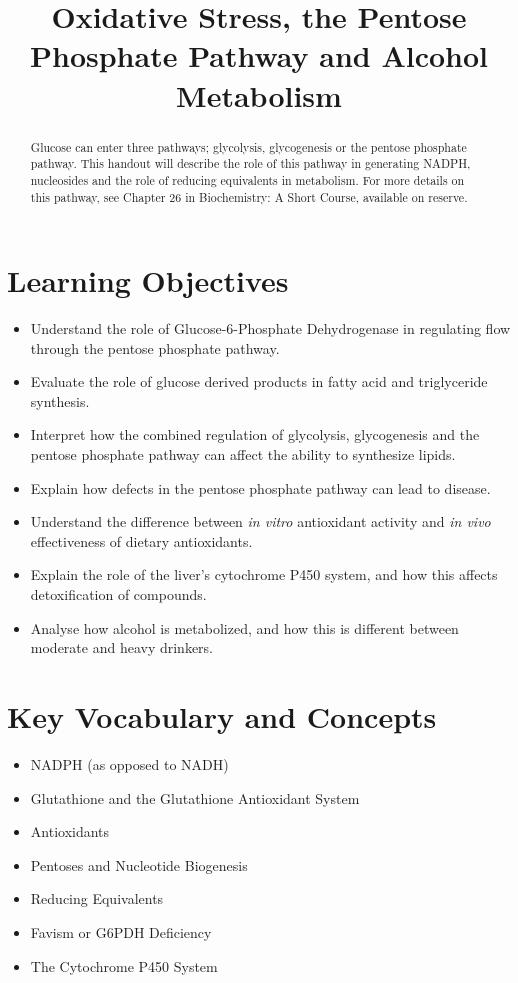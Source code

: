 \documentclass{tufte-handout}
\title{Oxidative Stress, the Pentose Phosphate Pathway and Alcohol Metabolism}
\author{}
\date{}  %
\begin{document}
\maketitle%

\begin{abstract}
\noindent Glucose can enter three pathways; glycolysis, glycogenesis or the pentose phosphate pathway.  This handout will describe the role of this pathway in generating NADPH, nucleosides and the role of reducing equivalents in metabolism.   For more details on this pathway, see Chapter 26 in Biochemistry: A Short Course, available on reserve\cite{Berg2015}.
\end{abstract}

\tableofcontents
\pagebreak
\section{Learning Objectives}

\begin{itemize}
\item Understand the role of Glucose-6-Phosphate Dehydrogenase in regulating flow through the pentose phosphate pathway.
\item Evaluate the role of glucose derived products in fatty acid and triglyceride synthesis.
\item Interpret how the combined regulation of glycolysis, glycogenesis and the pentose phosphate pathway can affect the ability to synthesize lipids.
\item Explain how defects in the pentose phosphate pathway can lead to disease.
\item Understand the difference between \textit{in vitro} antioxidant activity and \textit{in vivo} effectiveness of dietary antioxidants.
\item Explain the role of the liver's cytochrome P450 system, and how this affects detoxification of compounds.
\item Analyse how alcohol is metabolized, and how this is different between moderate and heavy drinkers.
\end{itemize}

\section{Key Vocabulary and Concepts}
\begin{itemize}
	\item NADPH (as opposed to NADH)
	\item Glutathione and the Glutathione Antioxidant System
	\item Antioxidants
	\item Pentoses and Nucleotide Biogenesis
	\item Reducing Equivalents
	\item Favism or G6PDH Deficiency
	\item The Cytochrome P450 System
\end{itemize}
\end{document}

